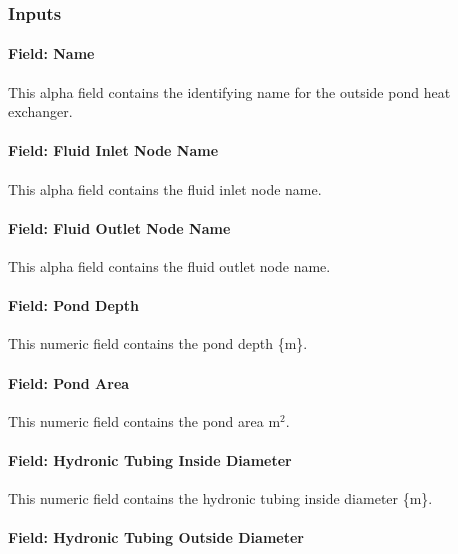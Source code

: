 \subsubsection{Inputs}\label{inputs-12-002}

\paragraph{Field: Name}\label{field-name-11-002}

This alpha field contains the identifying name for the outside pond heat exchanger.

\paragraph{Field: Fluid Inlet Node Name}\label{field-fluid-inlet-node-name}

This alpha field contains the fluid inlet node name.

\paragraph{Field: Fluid Outlet Node Name}\label{field-fluid-outlet-node-name}

This alpha field contains the fluid outlet node name.

\paragraph{Field: Pond Depth}\label{field-pond-depth}

This numeric field contains the pond depth \{m\}.

\paragraph{Field: Pond Area}\label{field-pond-area}

This numeric field contains the pond area m\(^{2}\).

\paragraph{Field: Hydronic Tubing Inside Diameter}\label{field-hydronic-tubing-inside-diameter}

This numeric field contains the hydronic tubing inside diameter \{m\}.

\paragraph{Field: Hydronic Tubing Outside Diameter}\label{field-hydronic-tubing-outside-diameter}

